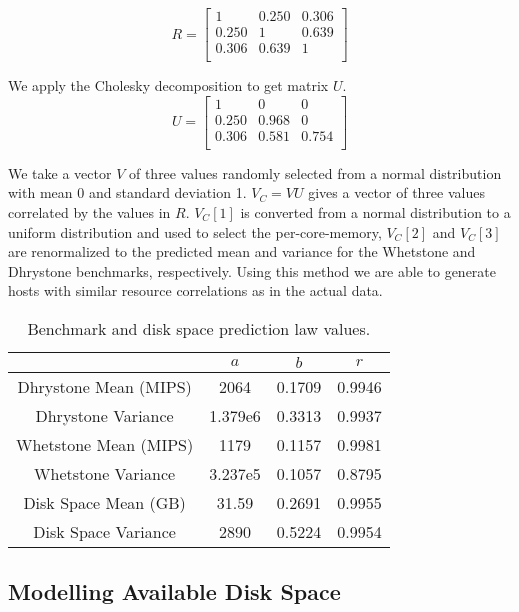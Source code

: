 \documentclass[conference]{IEEEtran}
\begin{document}
\[
R = \left[ {\begin{array}{ccc}
1 & 0.250 & 0.306 \\
0.250 & 1 & 0.639 \\
0.306 & 0.639 & 1 \\
\end{array} } \right]
\]

We apply the Cholesky decomposition to get matrix $U$.
\[
U = \left[ {\begin{array}{ccc}
1 & 0 & 0 \\
0.250 & 0.968 & 0 \\
0.306 & 0.581 & 0.754 \\
\end{array} } \right]
\]

We take a vector $V$ of three values randomly selected from a normal distribution with mean 0 and standard deviation 1.  $V_C = V U$ gives a vector of three values correlated by the values in $R$.  $V_C[1]$ is converted from a normal distribution to a uniform distribution and used to select the per-core-memory, $V_C[2]$ and $V_C[3]$ are renormalized to the predicted mean and variance for the Whetstone and Dhrystone benchmarks, respectively.  Using this method we are able to generate hosts with similar resource correlations as in the actual data.

\begin{table}
\caption{Benchmark and disk space prediction law values.}
\centering
\begin{tabular}{|c|c|c|c|}
\hline
& $a$ & $b$ & $r$ \\
\hline
Dhrystone Mean (MIPS) & 2064 & 0.1709 & 0.9946 \\
\hline
Dhrystone Variance & 1.379e6 & 0.3313 & 0.9937 \\
\hline
Whetstone Mean (MIPS) & 1179 & 0.1157 & 0.9981 \\
\hline
Whetstone Variance & 3.237e5 & 0.1057 & 0.8795 \\
\hline
Disk Space Mean (GB) & 31.59 & 0.2691 & 0.9955 \\
\hline
Disk Space Variance & 2890 & 0.5224 & 0.9954 \\
\hline
\end{tabular}
\label{benchmark-ratio-val-table}
\end{table}

\subsection{Modelling Available Disk Space}
\label{sec-model-disk}
\end{document}
